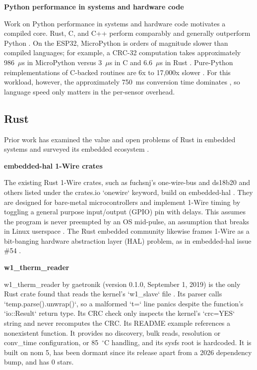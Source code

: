 \documentclass[conference]{IEEEtran}
\begin{document}
\textbf{Python performance in systems and hardware code}

Work on Python performance in systems and hardware code motivates a compiled core.
Rust, C, and C++ perform comparably and generally outperform Python \cite{bugden2022safety}.
On the ESP32, MicroPython is orders of magnitude slower than compiled languages; for example, a CRC-32 computation takes approximately 986~$\mu$s in MicroPython versus 3~$\mu$s in C and 6.6~$\mu$s in Rust \cite{plauska2022performance}.
Pure-Python reimplementations of C-backed routines are 6x to 17,000x slower \cite{ding2026stdlib}.
For this workload, however, the approximately 750~ms conversion time dominates \cite{ds18b20_datasheet}, so language speed only matters in the per-sensor overhead.

\subsection{Rust}

Prior work has examined the value and open problems of Rust in embedded systems \cite{sharma2024rust} and surveyed its embedded ecosystem \cite{vandervelden2024overview}.

\textbf{embedded-hal 1-Wire crates}

The existing Rust 1-Wire crates, such as fuchsnj's one-wire-bus and ds18b20 and others listed under the crates.io `onewire` keyword, build on embedded-hal \cite{fuchsnj_one_wire_bus, fuchsnj_ds18b20, crates_io_onewire}.
They are designed for bare-metal microcontrollers and implement 1-Wire timing by toggling a general purpose input/output (GPIO) pin with delays.
This assumes the program is never preempted by an OS mid-pulse, an assumption that breaks in Linux userspace \cite{adam2021performance}.
The Rust embedded community likewise frames 1-Wire as a bit-banging hardware abstraction layer (HAL) problem, as in embedded-hal issue \#54 \cite{embedded_hal_issue54}.

\textbf{w1\_therm\_reader}

w1\_therm\_reader by gaetronik (version 0.1.0, September 1, 2019) is the only Rust crate found that reads the kernel's `w1\_slave` file \cite{w1_therm_reader}.
Its parser calls `temp.parse().unwrap()`, so a malformed `t=` line panics despite the function's `io::Result` return type.
Its CRC check only inspects the kernel's `crc=YES` string and never recomputes the CRC.
Its README example references a nonexistent function.
It provides no discovery, bulk reads, resolution or conv\_time configuration, or 85~$^\circ$C handling, and its sysfs root is hardcoded.
It is built on nom 5, has been dormant since its release apart from a 2026 dependency bump, and has 0 stars.
\end{document}
